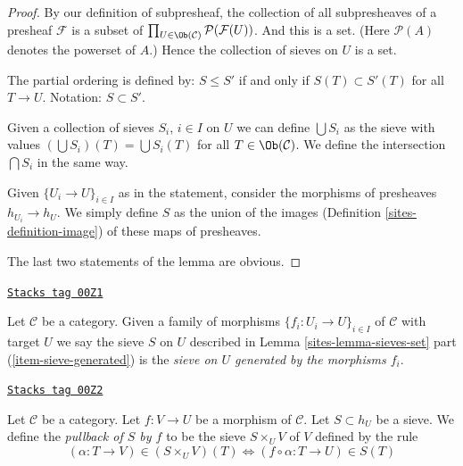 \begin{proof}

By our definition of subpresheaf, the collection of
all subpresheaves of a presheaf $\mathcal{F}$ is a subset of
$\prod_{U \in \Ob(\mathcal{C})} \mathcal{P}(\mathcal{F}(U))$.
And this is a set. (Here $\mathcal{P}(A)$ denotes
the powerset of $A$.) Hence the collection of sieves on $U$
is a set.

\medskip\noindent
The partial ordering is defined by: $S \leq S'$ if and only if
$S(T) \subset S'(T)$ for all $T \to U$. Notation: $S \subset S'$.

\medskip\noindent
Given a collection of sieves $S_i$, $i \in I$ on $U$ we can
define $\bigcup S_i$ as the sieve with values
$(\bigcup S_i)(T) = \bigcup S_i(T)$ for all
$T \in \Ob(\mathcal{C})$.
We define the intersection $\bigcap S_i$ in the same way.

\medskip\noindent
Given $\{U_i \to U\}_{i\in I}$ as in the statement, consider
the morphisms of presheaves $h_{U_i} \to h_U$. We simply
define $S$ as the union of the images (Definition \ref{sites-definition-image})
of these maps of presheaves.

\medskip\noindent
The last two statements of the lemma are obvious.
\end{proof}

\begin{definition}
\label{sites-definition-sieve-generated}
\href{https://stacks.math.columbia.edu/tag/00Z1}{\texttt{Stacks tag 00Z1}}

Let $\mathcal{C}$ be a category.
Given a family of morphisms $\{f_i : U_i \to U\}_{i\in I}$
of $\mathcal{C}$ with target $U$ we say the sieve
$S$ on $U$ described in Lemma \ref{sites-lemma-sieves-set}
part (\ref{item-sieve-generated}) is the {\it sieve  on $U$
generated by the morphisms $f_i$}.
\end{definition}

\begin{definition}
\label{sites-definition-pullback-sieve}
\href{https://stacks.math.columbia.edu/tag/00Z2}{\texttt{Stacks tag 00Z2}}

Let $\mathcal{C}$ be a category.
Let $f : V \to U$ be a morphism of $\mathcal{C}$.
Let $S \subset h_U$ be a sieve. We define the
{\it pullback of $S$ by $f$} to be the sieve
$S \times_U V$ of $V$ defined by the rule
$$
(\alpha : T \to V) \in (S \times_U V)(T)
\Leftrightarrow
(f \circ \alpha : T \to U) \in S(T)
$$
\end{definition}

